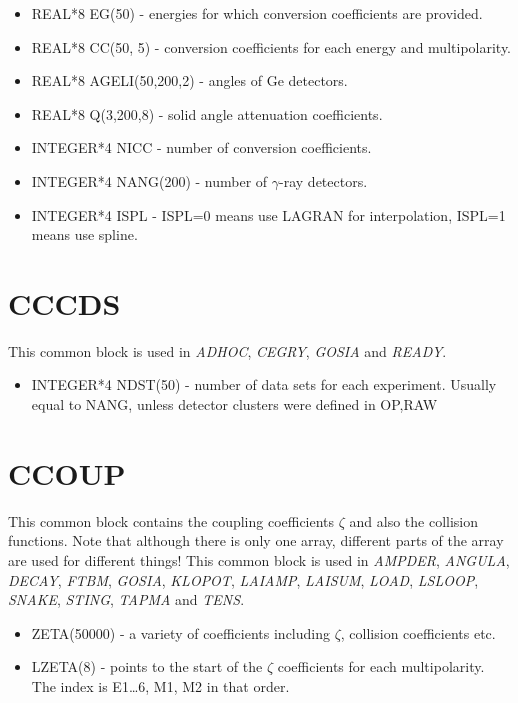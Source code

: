\begin{itemize}
\item REAL*8 EG(50) - energies for which conversion coefficients are
provided.
\item REAL*8 CC(50, 5) - conversion coefficients for each energy and
multipolarity.
\item REAL*8 AGELI(50,200,2) - angles of Ge detectors.
\item REAL*8 Q(3,200,8) - solid angle attenuation coefficients.
\item INTEGER*4 NICC - number of conversion coefficients.
\item INTEGER*4 NANG(200) - number of $\gamma$-ray detectors.
\item INTEGER*4 ISPL - ISPL=0 means use LAGRAN for interpolation, ISPL=1
means use spline.
\end{itemize}

\section{CCCDS}

This common block is used in \emph{ADHOC}, \emph{CEGRY}, \emph{GOSIA} and \emph{
READY}.

\begin{itemize}
\item INTEGER*4 NDST(50) - number of data sets for each experiment. Usually
equal to NANG, unless detector clusters were defined in OP,RAW
\end{itemize}

\section{CCOUP}

This common block contains the coupling coefficients $\zeta$ and also the
collision functions. Note that although there is only one array, different
parts of the array are used for different things! This common block is used
in \emph{AMPDER}, \emph{ANGULA}, \emph{DECAY}, \emph{FTBM}, \emph{GOSIA}, \emph{
KLOPOT}, \emph{LAIAMP}, \emph{LAISUM}, \emph{LOAD}, \emph{LSLOOP}, \emph{SNAKE},
\emph{STING}, \emph{TAPMA} and \emph{TENS}.

\begin{itemize}
\item ZETA(50000) - a variety of coefficients including $\zeta$, collision
coefficients etc.
\item LZETA(8) - points to the start of the $\zeta$ coefficients for each
multipolarity. The index is E1{\ldots}6, M1, M2 in that order.
\end{itemize}

